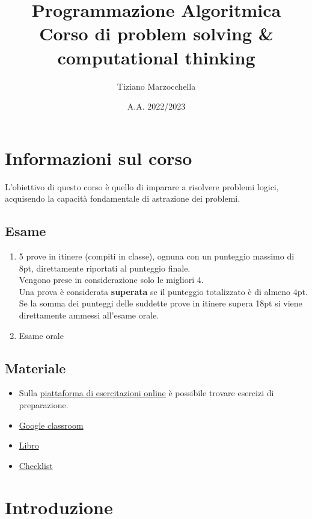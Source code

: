 \documentclass{article}
\title{
    Programmazione Algoritmica \\
    \large Corso di problem solving \& computational thinking
}
\author{Tiziano Marzocchella}
\date{A.A. 2022/2023}
\begin{document}


\section{Informazioni sul corso}
L'obiettivo di questo corso è quello di imparare a risolvere problemi logici, acquisendo la capacità fondamentale di astrazione dei problemi.
\subsection*{Esame}
\begin{enumerate}
  \item 5 prove in itinere (compiti in classe), ognuna con un punteggio massimo di 8pt, direttamente riportati al punteggio finale.\\
        Vengono prese in considerazione solo le migliori 4.\\
        Una prova è considerata \textbf{superata} se il punteggio totalizzato è di almeno 4pt.\\
        Se la somma dei punteggi delle suddette prove in itinere supera 18pt si viene direttamente ammessi all'esame orale.
  \item Esame orale
\end{enumerate}
\subsection*{Materiale}
\begin{itemize}
  \item Sulla \href{https://evo.di.unipi.it/student/courses/7/practices}{piattaforma di esercitazioni online} è possibile trovare esercizi di preparazione.
  \item \href{https://classroom.google.com/c/NDg5NzMxMzU4ODAx?cjc=qwfm6jd}{Google classroom}
  \item \href{https://t.me/c/1708877199/46}{Libro}
  \item \href{https://docs.google.com/document/d/1XU_2rwPUkni_s4h8Q-bLkLF9nwT4dSQA4DjgBqMaulg/edit?usp=drive_web&authuser=0}{Checklist}
\end{itemize}

\pagebreak

\section{Introduzione}
\end{document}
